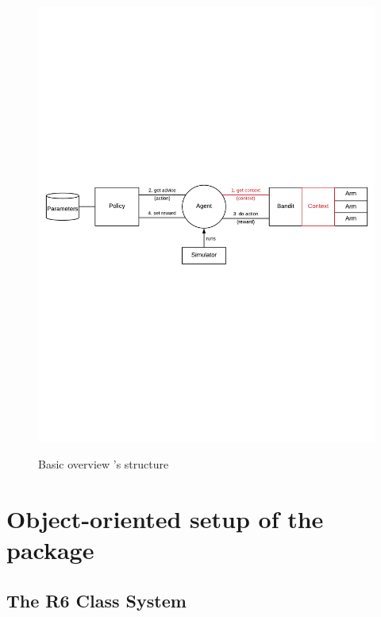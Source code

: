 \documentclass[nojss]{jss}\usepackage[]{graphicx}\usepackage[]{color}
\begin{document}
\begin{figure}[H]
  \centering
    \includegraphics[width=.99\textwidth]{fig/cmab_chart}
    \label{fig:cmab_chart}
      \caption{Basic overview 's structure}
\end{figure}











\section{Object-oriented setup of the package}

\subsection{The R6 Class System}
\end{document}
